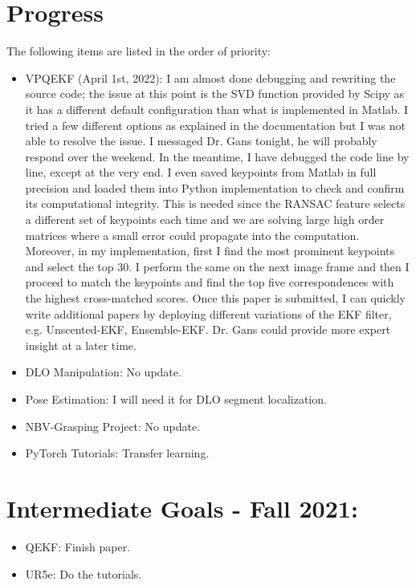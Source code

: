 \documentclass[11pt]{article}
\begin{document}
\section{Progress}
The following items are listed in the order of priority:
\begin{itemize}
      \item VPQEKF (April 1st, 2022): I am almost done debugging and rewriting
      the \cite{quest} source code; the issue at this point is the SVD function
      provided by Scipy as it has a
      different default configuration than what is implemented in Matlab. I
      tried a few different options as explained in the documentation but I was
      not able to resolve the issue. I messaged Dr. Gans tonight, he will
      probably respond over the weekend. In the meantime, I have debugged the
      code line by line, except at the very end. I even saved keypoints from Matlab
      in full precision and loaded them into Python implementation to check and
      confirm its computational integrity. This is needed since the RANSAC
      feature selects a different set of keypoints each time and we are solving
      large high order matrices where a small error could propagate into the
      computation. Moreover, in my
      implementation, first I find the most prominent keypoints and select the
      top 30. I perform the same on the next image frame and then I proceed to
      match the keypoints and find the top five correspondences with the
      highest cross-matched scores. Once this paper is submitted, I can quickly
      write additional papers by deploying different variations of the EKF
      filter, e.g. Unscented-EKF, Ensemble-EKF. Dr. Gans could provide more
      expert insight at a later time.
      \item DLO Manipulation: No update.
      \item Pose Estimation: I will need it for DLO segment localization.
      \item NBV-Grasping Project: No update.
      \item PyTorch Tutorials: Transfer learning.
\end{itemize}

\section{Intermediate Goals - Fall 2021:}
\begin{itemize}
      \item QEKF: Finish paper.
      \item UR5e: Do the tutorials.
\end{itemize}

\newpage

\newpage


\end{document}
